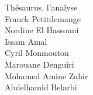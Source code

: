 \documentclass[a4paper, 12pt]{report}
\begin{document}
\begin{titlepage}
	\vspace*{\fill}
	\begin{center}
		{\Huge Thésaurus, l'analyse}\\
		\vspace{\fill}
		Franck Petitdemange \\
		Nordine El Hassouni \\
		Issam Amal \\
		Cyril Monmouton \\
		Marouane Denguiri \\
		Mohamed Amine Zahir \\
		Abdelhamid Belarbi
	\end{center}
	\vspace*{\fill}
	\center{\today}
\end{titlepage}

\tableofcontents
\end{document}
